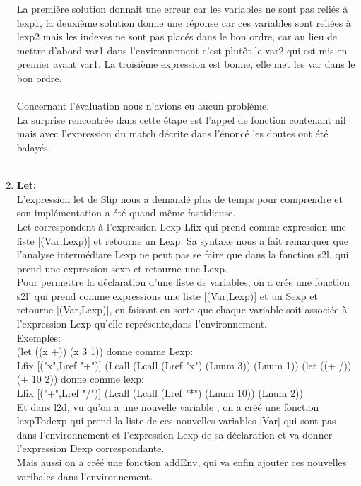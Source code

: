 \documentclass{article}
\begin{document}
\begin{enumerate}
    La première solution donnait une erreur car les variables ne sont pas reliés à lexp1, la deuxième solution donne une réponse car ces variables sont reliées à lexp2 mais les indexes ne sont pas placés dans le bon ordre, car au lieu de mettre d’abord var1 dans l’environnement c’est plutôt le var2 qui est mis en premier avant var1. La troisième expression est bonne, elle met les var dans le bon ordre.\\ \\
    Concernant l’évaluation nous n’avions eu aucun problème.\\
    La surprise rencontrée dans cette étape est l’appel de fonction contenant nil mais avec l’expression du match décrite dans l’énoncé les doutes ont été balayés.\\ \\


\item
    \textbf{Let:}\\
    L'expression let de Slip nous a demandé plus de temps pour comprendre et son implémentation a été quand même fastidieuse.\\
    Let correspondent à l'expression Lexp Lfix qui prend comme expression  une liste [(Var,Lexp)] et retourne un Lexp. Sa syntaxe nous a fait remarquer que l'analyse intermédiare Lexp ne peut pas se faire que dans la fonction s2l, qui prend une expression sexp et retourne une Lexp.\\
    
    Pour permettre la déclaration d'une liste de variables, on a crée une fonction s2l' qui prend comme expressions une liste [(Var,Lexp)] et un Sexp et retourne [(Var,Lexp)], en faisant en sorte que chaque variable soit associée à l'expression Lexp qu'elle représente,dans l'environnement.\\
    
    Exemples:\\
    (let ((x +)) (x 3 1))  donne comme Lexp:
    \\Lfix [("x",Lref "+")] (Lcall (Lcall (Lref "x") (Lnum 3)) (Lnum 1))
    (let ((+ /)) (+ 10 2)) donne comme lexp:
    \\Lfix [("+",Lref "/")] (Lcall (Lcall (Lref "*") (Lnum 10)) (Lnum 2))\\
    
    Et dans l2d, vu qu'on a une nouvelle variable , on a créé une fonction lexpTodexp qui prend la liste de ces nouvelles variables [Var] qui sont pas dans l'environnement et l'expression Lexp de sa déclaration et va donner l'expression Dexp correspondante.\\
    Mais aussi on a créé une fonction addEnv, qui va enfin ajouter ces nouvelles varibales dans l'environnement.\\
    

\end{enumerate}
\end{document}
